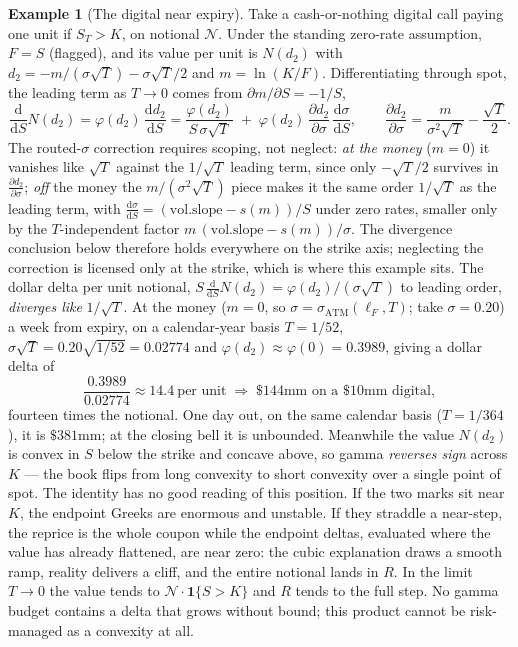 \documentclass[11pt]{book}
\theoremstyle{plain}
\theoremstyle{definition}
\newtheorem{example}[theorem]{Example}
\theoremstyle{remark}
\newcommand{\mln}{m}                             %
\newcommand{\lF}{\ell_F}                         %
\newcommand{\satm}{\sigma_{\mathrm{ATM}}}        %
\newcommand{\volslope}{\mathrm{vol.slope}}       %
\newcommand{\npdf}{\varphi}                      %
\newcommand{\ncdf}{N}                            %
\newcommand{\dd}{\mathrm{d}}                                  %
\newcommand{\pd}[2]{\frac{\partial #1}{\partial #2}}          %
\newcommand{\td}[2]{\frac{\dd #1}{\dd #2}}                    %
\begin{document}
\begin{example}[The digital near expiry]\label{ex:ch3:digital}
Take a cash-or-nothing digital call paying one unit if $S_T > K$, on notional
$\mathcal{N}$. Under the standing zero-rate assumption, $F = S$ (flagged), and
its value per unit is $\ncdf(d_2)$ with $d_2 = -\mln/(\sigma\sqrt{T}) -
\sigma\sqrt{T}/2$ and $\mln = \ln(K/F)$. Differentiating through spot, the
leading term as $T \to 0$ comes from $\partial \mln/\partial S = -1/S$,
\[
  \td{}{S}\ncdf(d_2)
  = \npdf(d_2)\,\td{d_2}{S}
  = \frac{\npdf(d_2)}{S\,\sigma\sqrt{T}}
    \;+\; \npdf(d_2)\,\pd{d_2}{\sigma}\,\td{\sigma}{S},
  \qquad
  \pd{d_2}{\sigma} = \frac{\mln}{\sigma^{2}\sqrt{T}} - \frac{\sqrt{T}}{2} .
\]
The routed-$\sigma$ correction requires scoping, not neglect: \emph{at the
money} ($\mln = 0$) it vanishes like $\sqrt{T}$ against the $1/\sqrt{T}$
leading term, since only $-\sqrt{T}/2$ survives in $\pd{d_2}{\sigma}$;
\emph{off} the money the $\mln/(\sigma^{2}\sqrt{T})$ piece makes it the same
order $1/\sqrt{T}$ as the leading term, with $\td{\sigma}{S} =
(\volslope - s(\mln))/S$ under zero rates, smaller only by the
$T$-independent factor $\mln\,(\volslope - s(\mln))/\sigma$. The divergence
conclusion below therefore holds everywhere on the strike axis; neglecting
the correction is licensed only at the strike, which is where this example
sits. The dollar delta per unit notional, $S\,\td{}{S}\ncdf(d_2) =
\npdf(d_2)/(\sigma\sqrt{T})$ to leading order, \emph{diverges like}
$1/\sqrt{T}$. At the money ($\mln = 0$, so $\sigma = \satm(\lF,T)$; take
$\sigma = 0.20$) a week from expiry, on a calendar-year basis $T = 1/52$,
$\sigma\sqrt{T} = 0.20\sqrt{1/52} = 0.02774$ and $\npdf(d_2) \approx
\npdf(0) = 0.3989$, giving a dollar delta of
\[
  \frac{0.3989}{0.02774} \approx 14.4 \ \text{per unit}
  \;\Longrightarrow\; \$144\text{mm on a } \$10\text{mm digital} ,
\]
fourteen times the notional. One day out, on the same calendar basis
($T = 1/364$), it is $\$381$mm; at the closing bell it is unbounded. Meanwhile the value $\ncdf(d_2)$ is convex in $S$ below the
strike and concave above, so gamma \emph{reverses sign} across $K$ --- the
book flips from long convexity to short convexity over a single point of spot.
The identity has no good reading of this position. If the two marks sit
near $K$, the endpoint Greeks are enormous and unstable. If they
straddle a near-step, the reprice is the whole coupon while the endpoint deltas,
evaluated where the value has already flattened, are near zero: the cubic
explanation draws a smooth ramp, reality delivers a cliff, and the entire
notional lands in $R$. In the limit $T \to 0$ the value tends to
$\mathcal{N}\cdot \mathbf{1}\{S > K\}$ and $R$ tends to the full step. No gamma
budget contains a delta that grows without bound; this product cannot be
risk-managed as a convexity at all.
\end{example}
\end{document}
